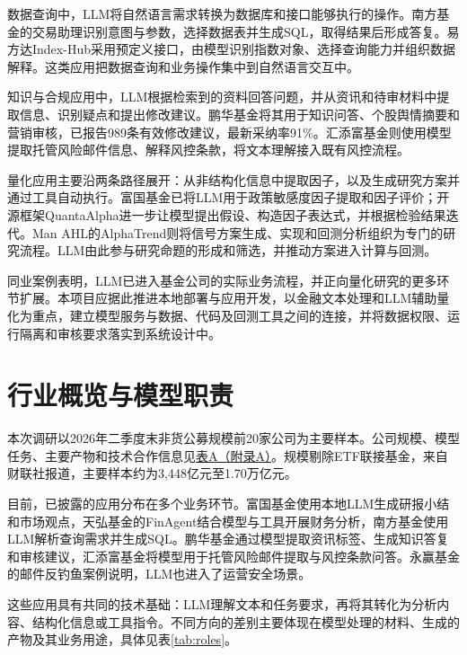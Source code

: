 \documentclass[11pt,a4paper,fontset=none]{ctexart}
\begin{document}
数据查询中，LLM将自然语言需求转换为数据库和接口能够执行的操作。南方基金的交易助理识别意图与参数，选择数据表并生成SQL，取得结果后形成答复。易方达Index-Hub采用预定义接口，由模型识别指数对象、选择查询能力并组织数据解释。这类应用把数据查询和业务操作集中到自然语言交互中。

知识与合规应用中，LLM根据检索到的资料回答问题，并从资讯和待审材料中提取信息、识别疑点和提出修改建议。鹏华基金将其用于知识问答、个股舆情摘要和营销审核，已报告989条有效修改建议，最新采纳率91\%。汇添富基金则使用模型提取托管风险邮件信息、解释风控条款，将文本理解接入既有风控流程。

量化应用主要沿两条路径展开：从非结构化信息中提取因子，以及生成研究方案并通过工具自动执行。富国基金已将LLM用于政策敏感度因子提取和因子评价；开源框架QuantaAlpha进一步让模型提出假设、构造因子表达式，并根据检验结果迭代。Man AHL的AlphaTrend则将信号方案生成、实现和回测分析组织为专门的研究流程。LLM由此参与研究命题的形成和筛选，并推动方案进入计算与回测。

同业案例表明，LLM已进入基金公司的实际业务流程，并正向量化研究的更多环节扩展。本项目应据此推进本地部署与应用开发，以金融文本处理和LLM辅助量化为重点，建立模型服务与数据、代码及回测工具之间的连接，并将数据权限、运行隔离和审核要求落实到系统设计中。
\clearpage
\tableofcontents
\clearpage

\section{行业概览与模型职责}
本次调研以2026年二季度末非货公募规模前20家公司为主要样本。公司规模、模型任务、主要产物和技术合作信息见\hyperref[tab:landscape]{表A（附录A）}。规模剔除ETF联接基金，来自财联社报道，主要样本约为3,448亿元至1.70万亿元。

目前，已披露的应用分布在多个业务环节。富国基金使用本地LLM生成研报小结和市场观点，天弘基金的FinAgent结合模型与工具开展财务分析，南方基金使用LLM解析查询需求并生成SQL。鹏华基金通过模型提取资讯标签、生成知识答复和审核建议，汇添富基金将模型用于托管风险邮件提取与风控条款问答。永赢基金的邮件反钓鱼案例说明，LLM也进入了运营安全场景。

这些应用具有共同的技术基础：LLM理解文本和任务要求，再将其转化为分析内容、结构化信息或工具指令。不同方向的差别主要体现在模型处理的材料、生成的产物及其业务用途，具体见表\ref{tab:roles}。
\end{document}
